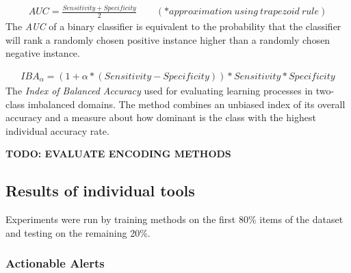 \begin{gather*}
AUC = \frac{Sensitivity + Specificity}{2} \qquad (*approximation \ using \ trapezoid \ rule)
\end{gather*} 
The \textit{AUC} of a binary classifier is equivalent to the probability that the classifier will rank a randomly chosen positive instance higher than a randomly chosen negative instance.


\begin{gather*}
IBA_{\alpha} = (1 + \alpha * (Sensitivity - Specificity)) * Sensitivity * Specificity
\end{gather*} 
The \textit{Index of Balanced Accuracy} used for evaluating learning processes in two-class imbalanced domains. The
method combines an unbiased index of its overall accuracy and a measure about
how dominant is the class with the highest individual accuracy rate.


%
%


\textbf{TODO: EVALUATE ENCODING METHODS}

\subsection{Results of individual tools}

Experiments were run by training methods on the first 80\% items of the dataset and testing on the remaining 20\%.

\subsubsection{Actionable Alerts}

